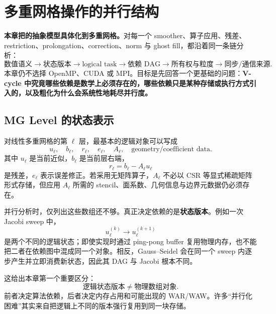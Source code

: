 \chapter{多重网格操作的并行结构}
\label{ch:mg-parallel-operations}

\begin{keybox}
\textbf{本章把的抽象模型具体化到多重网格。}对每一个 smoother、算子应用、残差、restriction、prolongation、correction、norm 与 ghost fill，都沿着同一条链分析：
\begin{equation}
\boxed{
\text{数值语义}
\rightarrow
\text{状态版本}
\rightarrow
\text{logical task}
\rightarrow
\text{依赖 DAG}
\rightarrow
\text{所有权与粒度}
\rightarrow
\text{同步/通信来源}.
}
\label{eq:mg-parallel-analysis-chain}
\end{equation}
本章仍不选择 OpenMP、CUDA 或 MPI。目标是先回答一个更基础的问题：\textbf{V-cycle 中究竟哪些依赖是数学上必须存在的，哪些依赖只是某种存储或执行方式引入的，以及粗化为什么会系统性地耗尽并行度。}
\end{keybox}

\section{MG Level 的状态表示}

对线性多重网格的第 $\ell$ 层，最基本的逻辑对象可以写成
\begin{equation}
\boxed{
u_\ell,\quad
b_\ell,\quad
r_\ell,\quad
e_\ell,\quad
A_\ell,\quad
\text{geometry/coefficient data}.
}
\label{eq:mg-parallel-level-data}
\end{equation}
其中 $u_\ell$ 是当前近似，$b_\ell$ 是当前层右端，
\begin{equation}
r_\ell=b_\ell-A_\ell u_\ell
\end{equation}
是残差，$e_\ell$ 表示误差修正。若采用无矩阵算子，$A_\ell$ 不必以 CSR 等显式稀疏矩阵形式存储，但应用 $A_\ell$ 所需的 stencil、面系数、几何信息与边界元数据仍必须存在。

并行分析时，仅列出这些数组还不够。真正决定依赖的是\textbf{状态版本}。例如一次 Jacobi sweep 中，
\begin{equation}
u_\ell^{(k)}
\longrightarrow
u_\ell^{(k+1)}
\end{equation}
是两个不同的逻辑状态；即使实现时通过 ping-pong buffer 复用物理内存，也不能把二者在依赖图中混成同一个对象。相反，Gauss--Seidel 会在同一个 sweep 内逐步产生并立即消费新状态，因此其 DAG 与 Jacobi 根本不同。

这给出本章第一个重要区分：
\begin{equation}
\boxed{
\text{逻辑状态版本}
\neq
\text{物理数组对象}.
}
\label{eq:mg-state-version-vs-storage}
\end{equation}
前者决定算法依赖，后者决定内存占用和可能出现的 WAR/WAW。许多“并行化困难”其实来自把逻辑上不同的版本强行复用到同一块存储。

